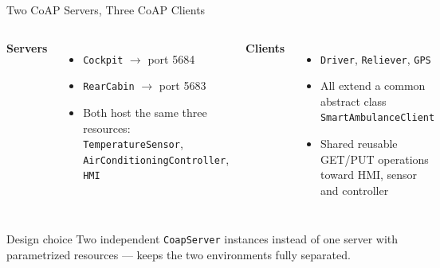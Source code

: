\documentclass[aspectratio=169]{beamer}
\begin{document}
\begin{frame}{Two CoAP Servers, Three CoAP Clients}
\begin{columns}
\textbf{Servers}
\begin{itemize}
\item \texttt{Cockpit} $\rightarrow$ port 5684
\item \texttt{RearCabin} $\rightarrow$ port 5683
\item Both host the same three resources: \texttt{TemperatureSensor}, \texttt{AirConditioningController}, \texttt{HMI}
\end{itemize}
\textbf{Clients}
\begin{itemize}
\item \texttt{Driver}, \texttt{Reliever}, \texttt{GPS}
\item All extend a common abstract class \texttt{SmartAmbulanceClient}
\item Shared reusable GET/PUT operations toward HMI, sensor and controller
\end{itemize}
\end{columns}
\vspace{0.4cm}
\begin{block}{Design choice}
Two independent \texttt{CoapServer} instances instead of one server with parametrized resources — keeps the two environments fully separated.
\end{block}
\end{frame}

\end{document}
